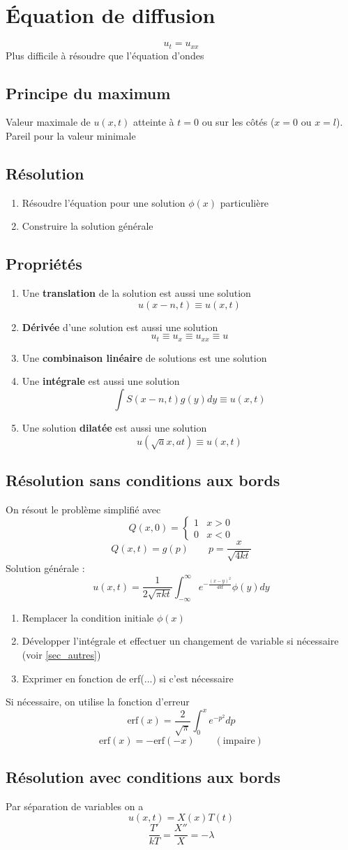 \documentclass[resume]{subfiles}
\begin{document}
\section{Équation de diffusion}
$$\boxed{u_{t}=u_{xx}}$$
Plus difficile à résoudre que l'équation d'ondes
\subsection{Principe du maximum}
Valeur maximale de $u(x,t)$ atteinte à $t=0$ ou sur les côtés ($x=0$ ou $x=l$). Pareil pour la valeur minimale
\subsection{Résolution}
\begin{enumerate}
\item Résoudre l'équation pour une solution $\phi(x)$ particulière
\item Construire la solution générale
\end{enumerate}
\subsection{Propriétés}
\begin{enumerate}
\item Une \textbf{translation} de la solution est aussi une solution
$$u(x-n,t)\equiv u(x,t)$$
\item \textbf{Dérivée} d'une solution est aussi une solution
$$u_t\equiv u_x\equiv u_{xx}\equiv u$$
\item Une \textbf{combinaison linéaire} de solutions est une solution
\item Une \textbf{intégrale} est aussi une solution
$$\int S(x-n,t)g(y)dy\equiv u(x,t)$$
\item Une solution \textbf{dilatée} est aussi une solution
$$u(\sqrt{a}x,at)\equiv u(x,t)$$
\end{enumerate}
\subsection{Résolution sans conditions aux bords}
On résout le problème simplifié avec
$$Q(x,0)=\begin{cases}1 & x>0\\0 & x<0\end{cases}$$
$$Q(x,t)=g(p)\qquad p=\frac{x}{\sqrt{4kt}}$$
Solution générale :
$$u(x,t)=\frac{1}{2\sqrt{\pi kt}}\int_{-\infty}^{\infty}e^{-\frac{(x-y)^2}{4kt}}\phi(y)dy$$
\begin{enumerate}
\item Remplacer la condition initiale $\phi(x)$
\item Développer l'intégrale et effectuer un changement de variable si nécessaire (voir \ref{sec_autres})
\item Exprimer en fonction de erf(...) si c'est nécessaire
\end{enumerate}
Si nécessaire, on utilise la fonction d'erreur
$$\text{erf}(x)=\frac{2}{\sqrt{\pi}}\int_{0}^{x}e^{-p^2}dp$$
$$\text{erf}(x)=-\text{erf}(-x)\qquad (\text{impaire})$$
\subsection{Résolution avec conditions aux bords}
Par séparation de variables on a 
$$u(x,t)=X(x)T(t)$$
$$\frac{T'}{kT}=\frac{X''}{X}=-\lambda$$
\end{document}
